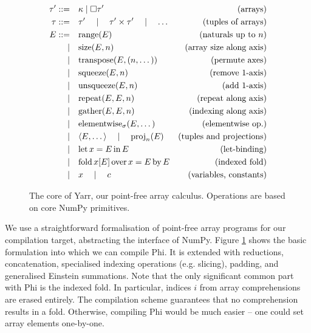 \begin{figure}
    \centering
    \begin{align*}
    \tau' ::=& \quad\kappa \mid \Box \tau' &\text{(arrays)} \\
    \tau ::=& \quad\tau' \quad\mid\quad \tau' \times \tau' \quad\mid\quad \dots &\text{(tuples of arrays)} \\
    E ::=&\quad \mathrm{range}(E)   &\text{(naturals up to }n\text{)} \\
    \mid&\quad \mathrm{size}(E, n)  &\text{(array size along axis)} \\
    \mid&\quad \mathrm{transpose}(E, (n, \dots)) &\text{(permute axes)} \\ 
    \mid&\quad \mathrm{squeeze}(E, n) &\text{(remove 1-axis)} \\
    \mid&\quad \mathrm{unsqueeze}(E, n) &\text{(add 1-axis)} \\
    \mid&\quad \mathrm{repeat}(E, E, n) &\text{(repeat along axis)} \\
    \mid&\quad \mathrm{gather}(E, E, n) &\text{(indexing along axis)} \\ 
    \mid&\quad \mathrm{elementwise}_\sigma(E, \dots) &\text{(elementwise op.)} \\
    \mid&\quad \langle E, \dots \rangle \quad\mid\quad \mathrm{proj}_n(E) &\text{(tuples and projections)} \\
    \mid&\quad \mathrm{let}\,{x}={E}\,\mathrm{in}\,{E} &\text{(let-binding)} \\
    \mid&\quad \mathrm{fold}\,{x}[{E}]\,\mathrm{over}\,{x} = {E}\,\mathrm{by}\,{E} &\text{(indexed fold)} \\
    \mid&\quad x \quad\mid\quad c  &\text{(variables, constants)}
    \end{align*}
    \caption{The core of Yarr, our point-free array calculus. Operations are based on core NumPy primitives.}
    \label{fig:yarr-definition}
\end{figure}

We use a straightforward formalisation of point-free array programs for our compilation target, abstracting the interface of NumPy.
Figure \ref{fig:yarr-definition} shows the basic formulation into which we can compile Phi. It is extended with reductions, concatenation, specialised indexing operations (e.g. slicing), padding, and generalised Einstein summations. Note that the only significant common part with Phi is the indexed fold. In particular, indices $i$ from array comprehensions are erased entirely. The compilation scheme guarantees that no comprehension results in a fold. Otherwise, compiling Phi would be much easier -- one could set array elements one-by-one.

